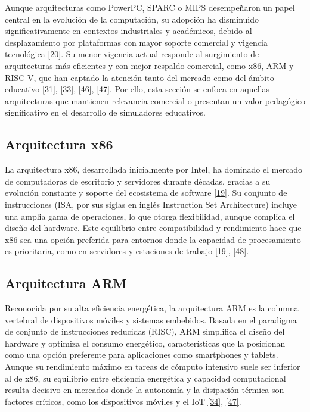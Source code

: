 \documentclass[12pt,oneside]{templates/unerthesis}
\begin{document}
Aunque arquitecturas como PowerPC, SPARC o MIPS desempeñaron un papel central en la evolución de la computación, su adopción ha disminuido significativamente en contextos industriales y académicos, debido al desplazamiento por plataformas con mayor soporte comercial y vigencia tecnológica \protect\hyperlink{ref-stallings_computer_2021}{{[}20{]}}. Su menor vigencia actual responde al surgimiento de arquitecturas más eficientes y con mejor respaldo comercial, como x86, ARM y RISC-V, que han captado la atención tanto del mercado como del ámbito educativo \protect\hyperlink{ref-waterman_risc-v_2014}{{[}31{]}}, \protect\hyperlink{ref-null_essentials_2023}{{[}33{]}}, \protect\hyperlink{ref-hennessy2017computer_riscv}{{[}46{]}}, \protect\hyperlink{ref-arm_evolution_2025}{{[}47{]}}. Por ello, esta sección se enfoca en aquellas arquitecturas que mantienen relevancia comercial o presentan un valor pedagógico significativo en el desarrollo de simuladores educativos.

\hypertarget{arquitectura-x86}{%
\subsection{Arquitectura x86}\label{arquitectura-x86}}

La arquitectura x86, desarrollada inicialmente por Intel, ha dominado el mercado de computadoras de escritorio y servidores durante décadas, gracias a su evolución constante y soporte del ecosistema de software \protect\hyperlink{ref-hennessy2017computer}{{[}19{]}}. Su conjunto de instrucciones (ISA, por sus siglas en inglés Instruction Set Architecture) incluye una amplia gama de operaciones, lo que otorga flexibilidad, aunque complica el diseño del hardware. Este equilibrio entre compatibilidad y rendimiento hace que x86 sea una opción preferida para entornos donde la capacidad de procesamiento es prioritaria, como en servidores y estaciones de trabajo \protect\hyperlink{ref-hennessy2017computer}{{[}19{]}}, \protect\hyperlink{ref-intel_whitepaper_2023}{{[}48{]}}.

\hypertarget{arquitectura-arm}{%
\subsection{Arquitectura ARM}\label{arquitectura-arm}}

Reconocida por su alta eficiencia energética, la arquitectura ARM es la columna vertebral de dispositivos móviles y sistemas embebidos. Basada en el paradigma de conjunto de instrucciones reducidas (RISC), ARM simplifica el diseño del hardware y optimiza el consumo energético, características que la posicionan como una opción preferente para aplicaciones como smartphones y tablets. Aunque su rendimiento máximo en tareas de cómputo intensivo suele ser inferior al de x86, su equilibrio entre eficiencia energética y capacidad computacional resulta decisivo en mercados donde la autonomía y la disipación térmica son factores críticos, como los dispositivos móviles y el IoT \protect\hyperlink{ref-patterson_computer_2014}{{[}34{]}}, \protect\hyperlink{ref-arm_evolution_2025}{{[}47{]}}.
\end{document}
